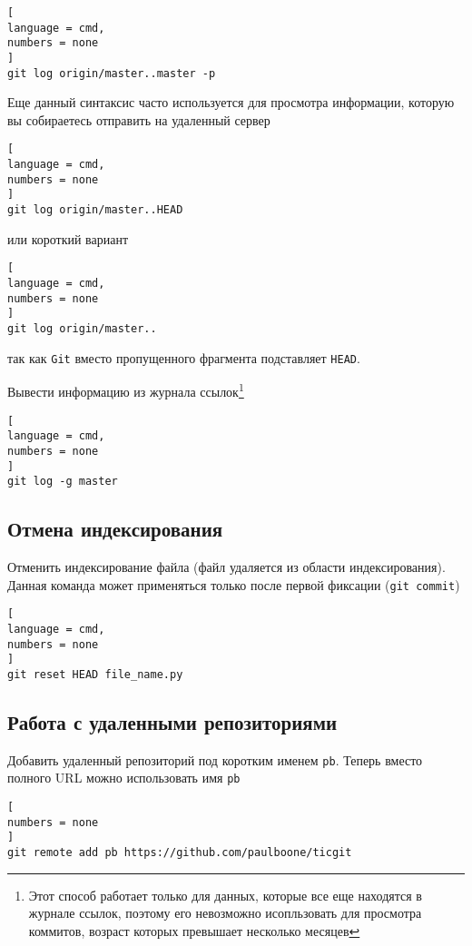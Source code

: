 \documentclass[%
	11pt,
	a4paper,
	utf8,
		]{article}
\begin{document}
\begin{lstlisting}[
language = cmd,
numbers = none
]
git log origin/master..master -p
\end{lstlisting}

Еще данный синтаксис часто используется для просмотра информации, которую вы собираетесь отправить на удаленный сервер

\begin{lstlisting}[
language = cmd,
numbers = none
]
git log origin/master..HEAD
\end{lstlisting}
или короткий вариант
\begin{lstlisting}[
language = cmd,
numbers = none
]
git log origin/master..
\end{lstlisting}
так как \texttt{Git} вместо пропущенного фрагмента подставляет \texttt{HEAD}.

Вывести информацию из журнала ссылок\footnote{Этот способ работает только для данных, которые все еще находятся в журнале ссылок, поэтому его невозможно исопльзовать для просмотра коммитов, возраст которых превышает несколько месяцев}

\begin{lstlisting}[
language = cmd,
numbers = none
]
git log -g master
\end{lstlisting}


\subsection{Отмена индексирования}

Отменить индексирование файла (файл удаляется из области индексирования). Данная команда может применяться только после первой фиксации (\texttt{git commit})

\begin{lstlisting}[
language = cmd,
numbers = none
]
git reset HEAD file_name.py
\end{lstlisting}


\subsection{Работа с удаленными репозиториями}

Добавить удаленный репозиторий под коротким именем \texttt{pb}. Теперь вместо полного URL можно использовать имя \texttt{pb}

\begin{lstlisting}[
numbers = none
]
git remote add pb https://github.com/paulboone/ticgit
\end{lstlisting}
\end{document}
